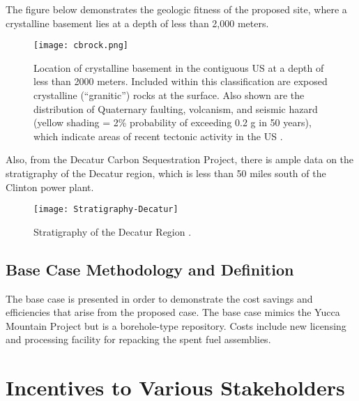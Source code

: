   The figure below demonstrates the geologic fitness of the proposed site, where 
  a crystalline basement lies at a depth of less than 2,000 meters.



\begin{figure}[!h] 
  \centering
  \texttt{[image: cbrock.png]}	
  \caption{Location of crystalline basement in the contiguous US at a depth of
less than 2000 meters.  Included within this classification are exposed
        crystalline (``granitic'') rocks at the surface. Also shown are the distribution
of Quaternary faulting, volcanism, and seismic hazard (yellow shading = 2\%
probability of exceeding 0.2 g in 50 years), which indicate areas of recent
tectonic activity in the US \cite{Perry_2015}.}
  \label{fig:cbrock}
\end{figure}

  
  \iffalse
\begin{figure}[!h] 
  \centering
  \texttt{[image: Crystalline-Thickness]}	
  \caption{Depth of Crystalline Rock
  \cite{Perry_2015}.}
  \label{fig:Depth}
\end{figure}
 \fi
  
  
  Also, from the Decatur Carbon Sequestration Project, there is ample data
  on the stratigraphy of the Decatur region, which is less than 50 miles south
  of the Clinton power plant.
 
  
  
  
\begin{figure}[!h] 
  \centering
  \texttt{[image: Stratigraphy-Decatur]}	
  \caption{Stratigraphy of the Decatur Region
  \cite{McDonald_2012}.}
  \label{fig:Stratigraphy}
\end{figure}
  
\subsection{Base Case Methodology and Definition}
The base case is presented in order to demonstrate the cost savings and efficiencies 
that arise from the proposed case. The base case mimics the Yucca Mountain Project
but is a borehole-type repository. Costs include new licensing and processing facility
 for repacking the spent fuel assemblies.


\section {Incentives to Various Stakeholders}

